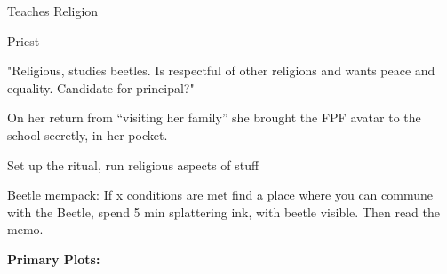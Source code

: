 \documentclass[char]{GL2020}
\begin{document}
\name{\cReligion{}}








Teaches Religion

Priest

"Religious, studies beetles.  Is respectful of other religions and wants peace and equality.
Candidate for principal?"

On her return from "`visiting her family"' she brought the FPF avatar to the school secretly, in her pocket.

Set up the ritual, run religious aspects of stuff

Beetle mempack:  If x conditions are met find a place where you can commune with the Beetle, spend 5 min splattering ink, with beetle visible.  Then read the memo.

\textbf{Primary Plots:}
\end{document}

